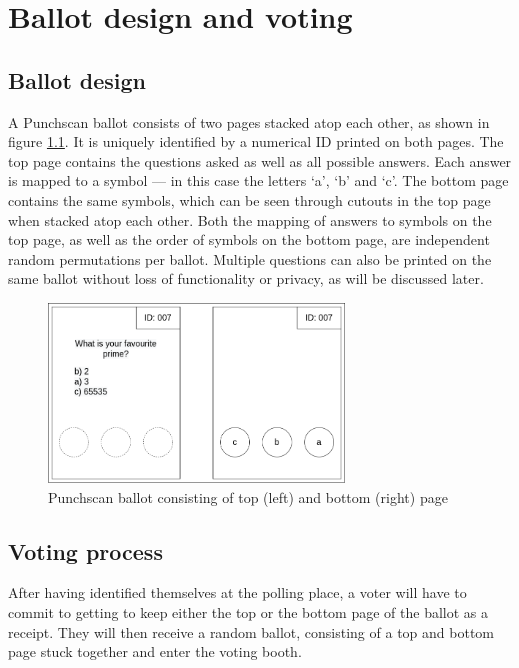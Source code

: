 \chapter{Ballot design and voting}
\label{ch:ballot_design_and_voting}

\section{Ballot design}

A Punchscan ballot consists of two pages stacked atop each other, as shown in
figure \ref{fig:punchscan_ballot}. It is uniquely identified by a numerical ID
printed on both pages. The top page contains the questions asked as well as all
possible answers. Each answer is mapped to a symbol --- in this case the
letters `a', `b' and `c'. The bottom page contains the same symbols, which can
be seen through cutouts in the top page when stacked atop each other. Both the
mapping of answers to symbols on the top page, as well as the order of symbols
on the bottom page, are independent random permutations per ballot. Multiple
questions can also be printed on the same ballot without loss of functionality
or privacy, as will be discussed later.

\begin{figure}[h]
\centering
\includegraphics[width=0.7\textwidth]{../resources/high_level_ballot.drawio}
\caption{Punchscan ballot consisting of top (left) and bottom (right) page}
\label{fig:punchscan_ballot}
\end{figure}

\section{Voting process}

After having identified themselves at the polling place, a voter will have to
commit to getting to keep either the top or the bottom page of the ballot as a
receipt. They will then receive a random ballot, consisting of a top and bottom
page stuck together and enter the voting booth.

